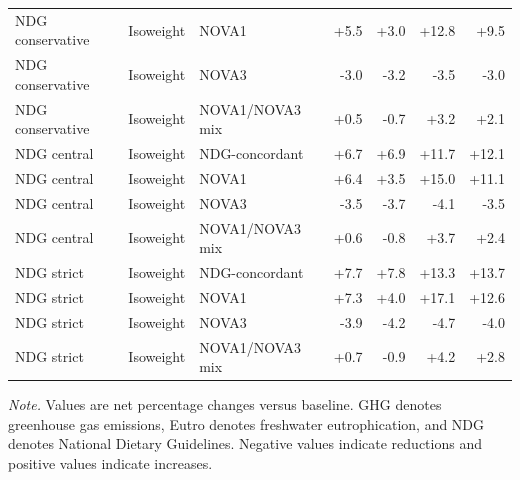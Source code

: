 ﻿\documentclass{article}
\newcommand{\tabnote}[1]{%
  \vspace{0.06cm}%
  {\footnotesize\setstretch{1}\par\raggedright\textit{Note.} #1\par}%
}
\begin{document}
\begin{table}[!htbp]
\begin{tabular}{lllrrrr}
NDG conservative & Isoweight & NOVA1 & +5.5 & +3.0 & +12.8 & +9.5\\
NDG conservative & Isoweight & NOVA3 & -3.0 & -3.2 & -3.5 & -3.0\\
NDG conservative & Isoweight & NOVA1/NOVA3 mix & +0.5 & -0.7 & +3.2 & +2.1\\
NDG central & Isoweight & NDG-concordant & +6.7 & +6.9 & +11.7 & +12.1\\
NDG central & Isoweight & NOVA1 & +6.4 & +3.5 & +15.0 & +11.1\\
NDG central & Isoweight & NOVA3 & -3.5 & -3.7 & -4.1 & -3.5\\
NDG central & Isoweight & NOVA1/NOVA3 mix & +0.6 & -0.8 & +3.7 & +2.4\\
NDG strict & Isoweight & NDG-concordant & +7.7 & +7.8 & +13.3 & +13.7\\
NDG strict & Isoweight & NOVA1 & +7.3 & +4.0 & +17.1 & +12.6\\
NDG strict & Isoweight & NOVA3 & -3.9 & -4.2 & -4.7 & -4.0\\
NDG strict & Isoweight & NOVA1/NOVA3 mix & +0.7 & -0.9 & +4.2 & +2.8\\
\bottomrule
\end{tabular}
\normalsize
\tabnote{Values are net percentage changes versus baseline. GHG denotes greenhouse gas emissions, Eutro denotes freshwater eutrophication, and NDG denotes National Dietary Guidelines. Negative values indicate reductions and positive values indicate increases.}
\end{table}

\vspace{0.8em}


\clearpage
\vspace{0.8em}


\clearpage

\end{document}
